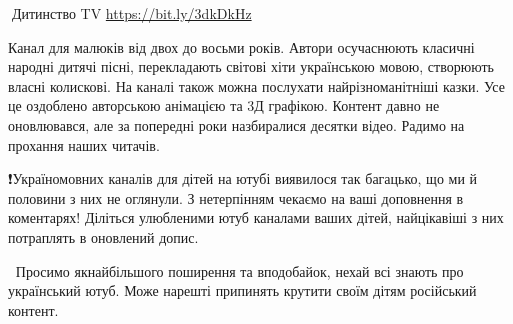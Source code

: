 🦉Дитинство TV \url{https://bit.ly/3dkDkHz}

Канал для малюків від двох до восьми років. Автори осучаснюють класичні народні дитячі пісні, перекладають світові хіти українською мовою, створюють власні колискові. На каналі також можна послухати найрізноманітніші казки. Усе це оздоблено авторською анімацією та 3Д графікою. Контент давно не оновлювався, але за попередні роки назбиралися десятки відео. Радимо на прохання наших читачів.

❗️Україномовних каналів для дітей на ютубі виявилося так багацько, що ми й половини з них не оглянули. З нетерпінням чекаємо на ваші доповнення в коментарях! Діліться улюбленими ютуб каналами ваших дітей, найцікавіші з них потраплять в оновлений допис.

💛💙Просимо якнайбільшого поширення та вподобайок, нехай всі знають про український ютуб. Може нарешті припинять крутити своїм дітям російський контент.

